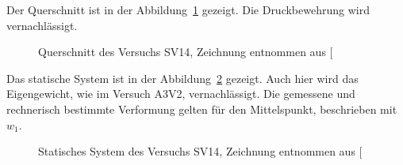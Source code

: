 \documentclass[
  11pt,
  letterpaper,
]{scrreprt}
\begin{document}
Der Querschnitt ist in der Abbildung~\ref{fig-QS-SV14} gezeigt. Die
Druckbewehrung wird vernachlässigt.

\begin{figure}[H]


\caption{\label{fig-QS-SV14}Querschnitt des Versuchs SV14, Zeichnung
entnommen aus {[}\citeproc{ref-gitz_ansatze_2024}{1}{]}}

\end{figure}%

Das statische System ist in der Abbildung~\ref{fig-system-SV14} gezeigt.
Auch hier wird das Eigengewicht, wie im Versuch A3V2, vernachlässigt.
Die gemessene und rechnerisch bestimmte Verformung gelten für den
Mittelspunkt, beschrieben mit \(w_1\).

\begin{figure}[H]


\caption{\label{fig-system-SV14}Statisches System des Versuchs SV14,
Zeichnung entnommen aus {[}\citeproc{ref-gitz_ansatze_2024}{1}{]}}

\end{figure}%
\end{document}
